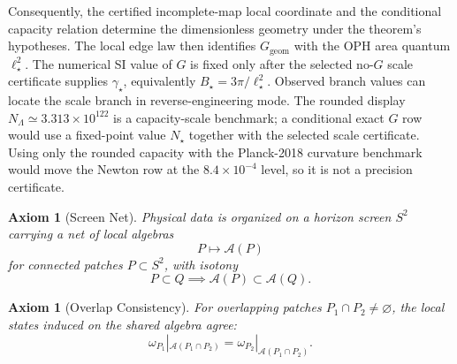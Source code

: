 \documentclass[11pt]{article}
\newtheorem{axiom}[theorem]{Axiom}
\begin{document}
Consequently, the certified incomplete-map local coordinate and the conditional capacity relation
determine the dimensionless geometry under the theorem's hypotheses. The local edge
law then identifies \(G_{\mathrm{geom}}\) with the OPH area quantum \(\ell_\star^2\). The numerical
SI value of \(G\) is fixed only after the selected no-\(G\) scale certificate supplies
\(\gamma_\star\), equivalently \(B_\star=3\pi/\ell_\star^2\).
Observed branch values can locate the scale branch in reverse-engineering mode. The rounded display
\(N_{\Lambda}\simeq3.313\times10^{122}\) is a capacity-scale benchmark; a conditional exact \(G\)
row would use a fixed-point value \(N_\star\) together with the selected scale certificate. Using only
the rounded capacity with the Planck-2018 curvature benchmark would move the Newton row at the
\(8.4\times10^{-4}\) level, so it is not a precision certificate.

\begin{axiom}[Screen Net]\label{ax:screen}
Physical data is organized on a horizon screen \(S^2\) carrying a net of local algebras
\[
P \longmapsto \mathcal A(P)
\]
for connected patches \(P\subset S^2\), with isotony
\[
P\subset Q \implies \mathcal A(P)\subset \mathcal A(Q).
\]
\end{axiom}

\begin{axiom}[Overlap Consistency]\label{ax:overlap}
For overlapping patches \(P_1\cap P_2\neq\varnothing\), the local states induced on the shared algebra agree:
\[
\omega_{P_1}|_{\mathcal A(P_1\cap P_2)}
=
\omega_{P_2}|_{\mathcal A(P_1\cap P_2)}.
\]
\end{axiom}
\end{document}
